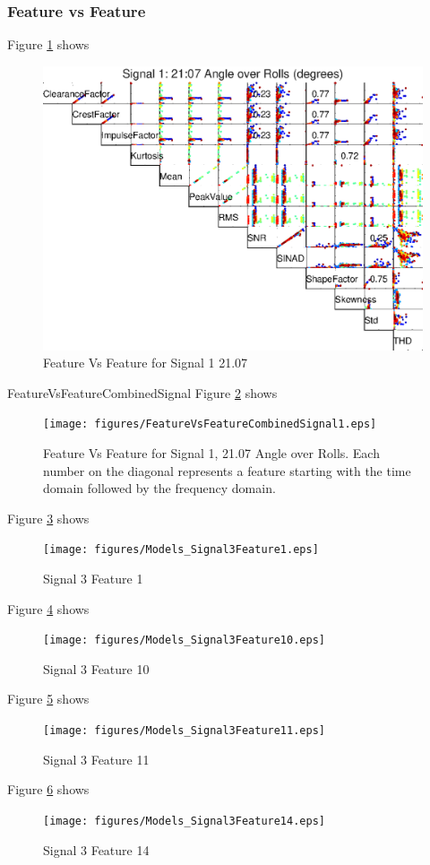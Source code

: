 \documentclass{article}
\begin{document}
\subsubsection{Feature vs Feature}
Figure \ref{fig:FeatureVsFeatureSignal1} shows 
\begin{figure}[H]
    \centering
    \includegraphics[width=\textwidth, height=\textheight, keepaspectratio]{figures/FeatureVsFeatureSignal1.eps}
    \caption{Feature Vs Feature for Signal 1 21.07}
    \label{fig:FeatureVsFeatureSignal1}
\end{figure}
FeatureVsFeatureCombinedSignal
Figure \ref{fig:FeatureVsFeatureCombinedSignal1} shows 
\begin{figure}[H]
    \centering
    \texttt{[image: figures/FeatureVsFeatureCombinedSignal1.eps]}
    \caption{Feature Vs Feature for Signal 1, 21.07 Angle over Rolls. Each number on the diagonal represents a feature starting with the time domain followed by the frequency domain.}
    \label{fig:FeatureVsFeatureCombinedSignal1}
\end{figure}

Figure \ref{fig:Models_Signal3Feature1} shows 
\begin{figure}[H]
    \centering
    \texttt{[image: figures/Models\_Signal3Feature1.eps]}
    \caption{Signal 3 Feature 1}
    \label{fig:Models_Signal3Feature1}
\end{figure}
Figure \ref{fig:Models_Signal3Feature10} shows 
\begin{figure}[H]
    \centering
    \texttt{[image: figures/Models\_Signal3Feature10.eps]}
    \caption{Signal 3 Feature 10}
    \label{fig:Models_Signal3Feature10}
\end{figure}
Figure \ref{fig:Models_Signal3Feature11} shows 
\begin{figure}[H]
    \centering
    \texttt{[image: figures/Models\_Signal3Feature11.eps]}
    \caption{Signal 3 Feature 11}
    \label{fig:Models_Signal3Feature11}
\end{figure}
Figure \ref{fig:Models_Signal3Feature14} shows 
\begin{figure}[H]
    \centering
    \texttt{[image: figures/Models\_Signal3Feature14.eps]}
    \caption{Signal 3 Feature 14}
    \label{fig:Models_Signal3Feature14}
\end{figure}
\end{document}
